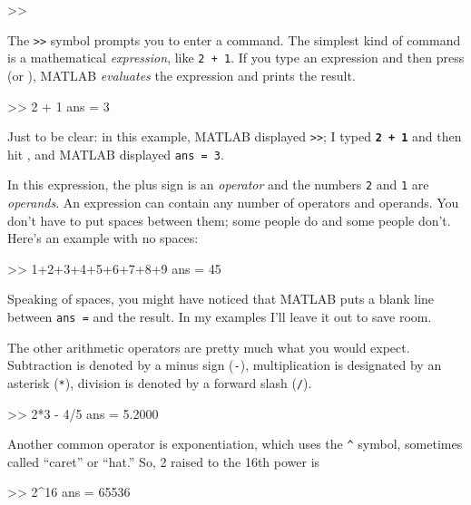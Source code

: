 \begin{code}
>>
\end{code}

The \lstinline{>>} symbol prompts you to enter a command.
The simplest kind of command is a mathematical \emph{expression},
like \lstinline{2 + 1}.
If you type an expression and then press  (or ), MATLAB
\emph{evaluates} the expression and prints the result.

\begin{code}
>> 2 + 1
ans = 3
\end{code}

Just to be clear: in this example, MATLAB displayed \lstinline{>>}; I
typed \textbf{\lstinline{2 + 1}} and then hit , and MATLAB displayed \lstinline{ans = 3}.


In this expression, the plus sign is an \emph{operator} and the numbers \lstinline{2} and \lstinline{1} are \emph{operands}.
An expression can contain any number of operators and operands.  You
don't have to put spaces between them; some people do and some people
don't. Here's an example with no spaces:

\begin{code}
>> 1+2+3+4+5+6+7+8+9
ans = 45
\end{code}

Speaking of spaces, you might have noticed that MATLAB puts a blank
line between \lstinline{ans =} and the result.  In my examples I'll leave it out to  save room.


The other arithmetic operators are pretty much what you would expect.
Subtraction is denoted by a minus sign (\lstinline{-}), multiplication is designated by
an asterisk (\lstinline{*}), division is denoted by a forward slash (\lstinline{/}).

\begin{code}
>> 2*3 - 4/5
ans = 5.2000
\end{code}

Another common operator is exponentiation, which uses the \lstinline{^}
symbol, sometimes called ``caret'' or ``hat.''  So, 2 raised to the
16th power is

\begin{code}
>> 2^16
ans = 65536
\end{code}

